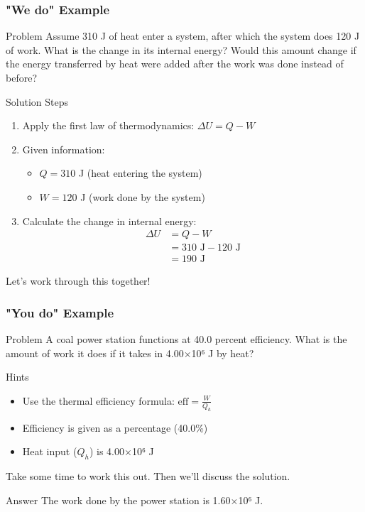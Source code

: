 \documentclass{beamer}
\begin{document}
\begin{frame}
    \frametitle{"We do" Example}
    \begin{block}{Problem}
        Assume 310 J of heat enter a system, after which the system does 120 J of work. What is the change in its internal energy? Would this amount change if the energy transferred by heat were added after the work was done instead of before?
    \end{block}
    \pause
    \begin{exampleblock}{Solution Steps}
        \begin{enumerate}
            \item Apply the first law of thermodynamics: $\Delta U = Q - W$
            \item Given information:
            \begin{itemize}
                \item $Q = 310$ J (heat entering the system)
                \item $W = 120$ J (work done by the system)
            \end{itemize}
            
            \item Calculate the change in internal energy:
            \begin{align*}
                \Delta U &= Q - W \\
                &= 310 \text{ J} - 120 \text{ J} \\
                &= 190 \text{ J}
            \end{align*}
             \end{enumerate}
    \end{exampleblock}
    
    Let's work through this together!
\end{frame}

\begin{frame}
    \frametitle{"You do" Example}
    \begin{block}{Problem}
        A coal power station functions at 40.0 percent efficiency. What is the amount of work it does if it takes in 4.00×10⁶ J by heat?
    \end{block}
    \pause
    \begin{alertblock}{Hints}
        \begin{itemize}
            \item Use the thermal efficiency formula: $\text{eff} = \frac{W}{Q_h}$
            \item Efficiency is given as a percentage (40.0\%)
            \item Heat input ($Q_h$) is 4.00×10⁶ J
        \end{itemize}
    \end{alertblock}
    
    Take some time to work this out. Then we'll discuss the solution.
    
    \pause
    
    \begin{exampleblock}{Answer}
        The work done by the power station is 1.60×10⁶ J.
    \end{exampleblock}
\end{frame}
\end{document}

